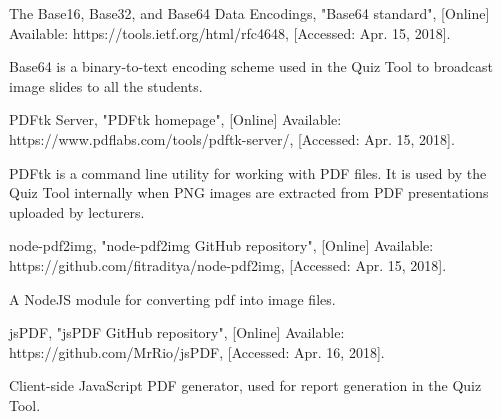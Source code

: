 \documentclass[11pt,a4paper]{report}
\begin{document}
\begin{thebibliography}{1}
 The Base16, Base32, and Base64 Data Encodings, "Base64 standard", [Online] Available: https://tools.ietf.org/html/rfc4648, [Accessed: Apr. 15, 2018].

    Base64 is a binary-to-text encoding scheme used in the Quiz Tool to broadcast image slides to all the students.

 PDFtk Server, "PDFtk homepage", [Online] Available: https://www.pdflabs.com/tools/pdftk-server/, [Accessed: Apr. 15, 2018].

    PDFtk is a command line utility for working with PDF files. It is used by the Quiz Tool internally when PNG images are extracted
    from PDF presentations uploaded by lecturers.

 node-pdf2img, "node-pdf2img GitHub repository", [Online] Available: https://github.com/fitraditya/node-pdf2img, [Accessed: Apr. 15, 2018].

    A NodeJS module for converting pdf into image files.

 jsPDF, "jsPDF GitHub repository", [Online] Available: https://github.com/MrRio/jsPDF, [Accessed: Apr. 16, 2018].

    Client-side JavaScript PDF generator, used for report generation in the Quiz Tool.

\end{thebibliography}
\end{document}
